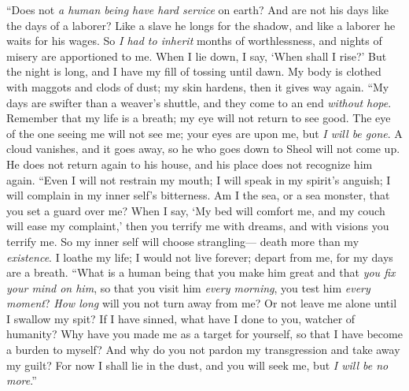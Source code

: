 \begin{biblechapter} %
 “Does not \textit{a human being have hard service} on earth? 
And are not his days like the days of a laborer?
\verse Like a slave he longs for the shadow, 
and like a laborer he waits for his wages.
\verse So \textit{I had to inherit} months of worthlessness, 
and nights of misery are apportioned to me.
\verse When I lie down, I say, ‘When shall I rise?’ 
But the night is long, 
and I have my fill of tossing until dawn.
\verse My body is clothed with maggots and clods of dust; 
my skin hardens, then it gives way again.
\verse “My days are swifter than a weaver’s shuttle, 
and they come to an end \textit{without hope}.
\verse Remember that my life is a breath; 
my eye will not return to see good.
\verse The eye of the one seeing me will not see me; 
your eyes are upon me, but \textit{I will be gone}.
\verse A cloud vanishes, and it goes away, 
so he who goes down to Sheol will not come up.
\verse He does not return again to his house, 
and his place does not recognize him again.
\verse “Even I will not restrain my mouth; 
I will speak in my spirit’s anguish; 
I will complain in my inner self’s bitterness.
\verse Am I the sea, or a sea monster, 
that you set a guard over me?
\verse When I say, ‘My bed will comfort me, 
and my couch will ease my complaint,’
\verse then you terrify me with dreams, 
and with visions you terrify me.
\verse So my inner self will choose strangling— 
death more than my \textit{existence}.
\verse I loathe my life; I would not live forever; 
depart from me, for my days are a breath.
\verse “What is a human being that you make him great 
and that \textit{you fix your mind on him},
\verse so that you visit him \textit{every morning}, 
you test him \textit{every moment}?
\verse \textit{How long} will you not turn away from me? 
Or not leave me alone until I swallow my spit?
\verse If I have sinned, what have I done to you, watcher of humanity? 
Why have you made me as a target for yourself, 
so that I have become a burden to myself?
\verse And why do you not pardon my transgression 
and take away my guilt? 
For now I shall lie in the dust, 
and you will seek me, but \textit{I will be no more}.”
\end{biblechapter}

